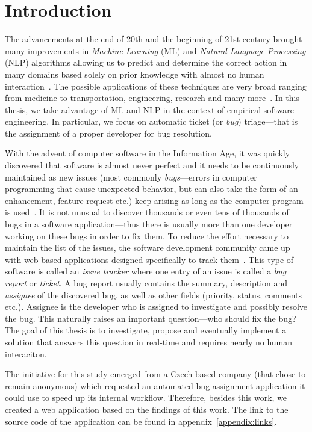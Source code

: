 \chapter{Introduction}

The advancements at the end of 20th and the beginning of 21st century brought many improvements in \textit{Machine Learning} (ML) and \textit{Natural Language Processing} (NLP) algorithms allowing us to predict and determine the correct action in many domains based solely on prior knowledge with almost no human interaction~\cite{carbonell1983overview}. The possible applications of these techniques are very broad ranging from medicine to transportation, engineering, research and many more~\cite{kononenko2001machine}\cite{nguyen1990neural}. In this thesis, we take advantage of ML and NLP in the context of empirical software engineering. In particular, we focus on automatic ticket (or \textit{bug}) triage---that is the assignment of a proper developer for bug resolution.

With the advent of computer software in the Information Age, it was quickly discovered that software is almost never perfect and it needs to be continuously maintained as new issues (most commonly \textit{bugs}---errors in computer programming that cause unexpected behavior, but can also take the form of an enhancement, feature request etc.) keep arising as long as the computer program is used~\cite{nist2002}. It is not unusual to discover thousands or even tens of thousands of bugs in a software application---thus there is usually more than one developer working on these bugs in order to fix them. To reduce the effort necessary to maintain the list of the issues, the software development community came up with web-based applications designed specifically to track them~\cite{bertram2010communication}. This type of software is called an \textit{issue tracker} where one entry of an issue is called a \textit{bug report} or \textit{ticket}. A bug report usually contains the summary, description and \textit{assignee} of the discovered bug, as well as other fields (priority, status, comments etc.). Assignee is the developer who is assigned to investigate and possibly resolve the bug. This naturally raises an important question---who should fix the bug?~\cite{Anvik2006} The goal of this thesis is to investigate, propose and eventually implement a solution that answers this question in real-time and requires nearly no human interaciton.

The initiative for this study emerged from a Czech-based company (that chose to remain anonymous) which requested an automated bug assignment application it could use to speed up its internal workflow. Therefore, besides this work, we created a web application based on the findings of this work. The link to the source code of the application can be found in appendix~\ref{appendix:links}.

